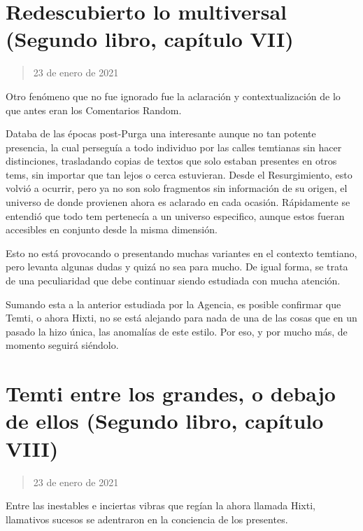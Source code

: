 \documentclass[
  spanish,
]{book}
\begin{document}
\hypertarget{redescubierto-lo-multiversal-segundo-libro-capuxedtulo-vii}{%
\section{Redescubierto lo multiversal (Segundo libro, capítulo VII)}\label{redescubierto-lo-multiversal-segundo-libro-capuxedtulo-vii}}

\begin{quote}
23 de enero de 2021
\end{quote}

Otro fenómeno que no fue ignorado fue la aclaración y contextualización de lo que antes eran los Comentarios Random.

Databa de las épocas post-Purga una interesante aunque no tan potente presencia, la cual perseguía a todo individuo por las calles temtianas sin hacer distinciones, trasladando copias de textos que solo estaban presentes en otros tems, sin importar que tan lejos o cerca estuvieran. Desde el Resurgimiento, esto volvió a ocurrir, pero ya no son solo fragmentos sin información de su origen, el universo de donde provienen ahora es aclarado en cada ocasión. Rápidamente se entendió que todo tem pertenecía a un universo especifico, aunque estos fueran accesibles en conjunto desde la misma dimensión.

Esto no está provocando o presentando muchas variantes en el contexto temtiano, pero levanta algunas dudas y quizá no sea para mucho. De igual forma, se trata de una peculiaridad que debe continuar siendo estudiada con mucha atención.

Sumando esta a la anterior estudiada por la Agencia, es posible confirmar que Temti, o ahora Hixti, no se está alejando para nada de una de las cosas que en un pasado la hizo única, las anomalías de este estilo. Por eso, y por mucho más, de momento seguirá siéndolo.

\hypertarget{temti-entre-los-grandes-o-debajo-de-ellos-segundo-libro-capuxedtulo-viii}{%
\section{Temti entre los grandes, o debajo de ellos (Segundo libro, capítulo VIII)}\label{temti-entre-los-grandes-o-debajo-de-ellos-segundo-libro-capuxedtulo-viii}}

\begin{quote}
23 de enero de 2021
\end{quote}

Entre las inestables e inciertas vibras que regían la ahora llamada Hixti, llamativos sucesos se adentraron en la conciencia de los presentes.
\end{document}
